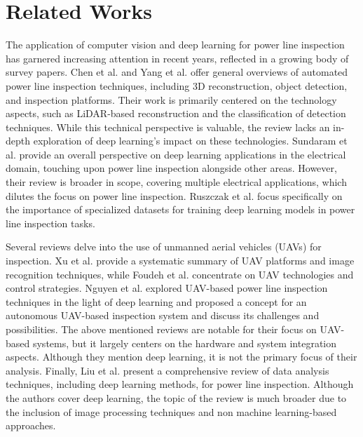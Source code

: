 \section{Related Works}\label{sec:related_works}
The application of computer vision and deep learning for power line inspection has garnered increasing attention in recent years, reflected in a growing body of survey papers. Chen et al. \cite{chen2021environment} and Yang et al. \cite{yang2020review} offer general overviews of automated power line inspection techniques, including 3D reconstruction, object detection, and inspection platforms. Their work is primarily centered on the technology aspects, such as LiDAR-based reconstruction and the classification of detection techniques. While this technical perspective is valuable, the review lacks an in-depth exploration of deep learning's impact on these technologies. Sundaram et al. \cite{sundaram2021deep} provide an overall perspective on deep learning applications in the electrical domain, touching upon power line inspection alongside other areas. However, their review is broader in scope, covering multiple electrical applications, which dilutes the focus on power line inspection. Ruszczak et al. \cite{ruszczak2023overview} focus specifically on the importance of specialized datasets for training deep learning models in power line inspection tasks. 

Several reviews delve into the use of unmanned aerial vehicles (UAVs) for inspection. Xu et al. \cite{xu2023development} provide a systematic summary of UAV platforms and image recognition techniques, while Foudeh et al. \cite{foudeh2021advanced} concentrate on UAV technologies and control strategies. Nguyen et al. \cite{nguyen_intelligent_2019, nguyen_automatic_2018} explored UAV-based power line inspection techniques in the light of deep learning and proposed a concept for an autonomous UAV-based inspection system and discuss its challenges and possibilities. The above mentioned reviews are notable for their focus on UAV-based systems, but it largely centers on the hardware and system integration aspects. Although they mention deep learning, it is not the primary focus of their analysis. Finally, Liu et al. \cite{liu_data_2020} present a comprehensive review of data analysis techniques, including deep learning methods, for power line inspection. Although the authors cover deep learning, the topic of the review is much broader due to the inclusion of image processing techniques and non machine learning-based approaches.

